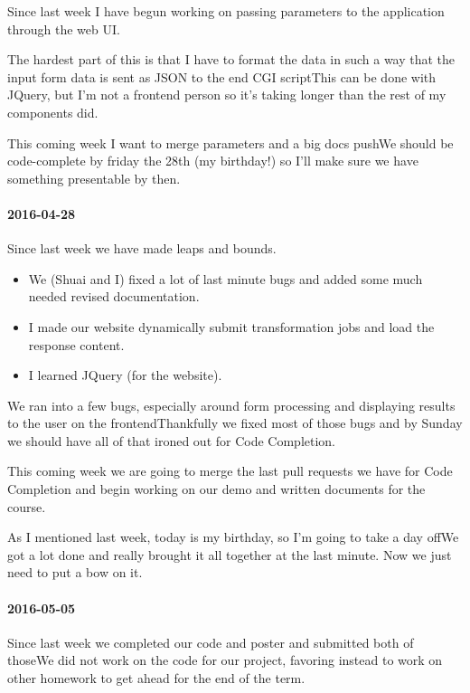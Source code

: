 Since last week I have begun working on passing parameters to the application through the web UI.

The hardest part of this is that I have to format the data in such a way that the input form data is sent as JSON to the end CGI scriptThis can be done with JQuery, but I'm not a frontend person so it's taking longer than the rest of my components did.

This coming week I want to merge parameters and a big docs pushWe should be code-complete by friday the 28th (my birthday!) so I'll make sure we have something presentable by then.

\paragraph{2016-04-28}

Since last week we have made leaps and bounds.

\begin{itemize}
  \item We (Shuai and I) fixed a lot of last minute bugs and added some much needed revised documentation.
  \item I made our website dynamically submit transformation jobs and load the response content.
  \item I learned JQuery (for the website).
\end{itemize}

We ran into a few bugs, especially around form processing and displaying results to the user on the frontendThankfully we fixed most of those bugs and by Sunday we should have all of that ironed out for Code Completion.

This coming week we are going to merge the last pull requests we have for Code Completion and begin working on our demo and written documents for the course.

As I mentioned last week, today is my birthday, so I'm going to take a day offWe got a lot done and really brought it all together at the last minute.
Now we just need to put a bow on it.

\paragraph{2016-05-05}

Since last week we completed our code and poster and submitted both of thoseWe did not work on the code for our project, favoring instead to work on other homework to get ahead for the end of the term.

